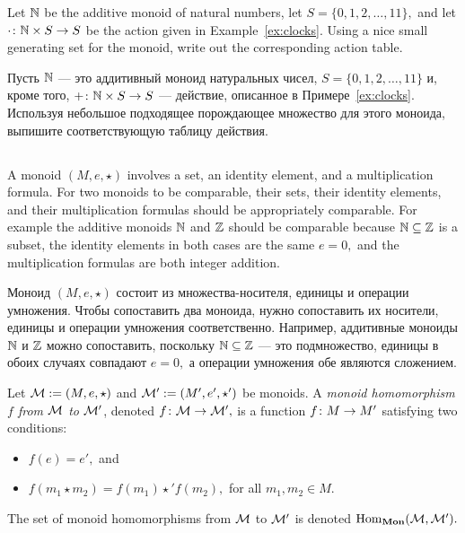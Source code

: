\documentclass[../main/CT4S-EN-RU]{subfiles}
\begin{document}
\begin{exerciseENG}
Let ${\mathbb N}$ be the additive monoid of natural numbers, let $S=\{0,1,2,\ldots,11\},$ and let $\cdot\colon{\mathbb N}\times S\rightarrow S$ be the action given in Example~\ref{ex:clocks}. Using a nice small generating set for the monoid, write out the corresponding action table.
\end{exerciseENG}

\begin{exerciseRUS}
Пусть ${\mathbb N}$ — это аддитивный моноид натуральных чисел, $S=\{0,1,2,\ldots,11\}$ и, кроме того,  $+\colon{\mathbb N}\times S\rightarrow S$ — действие, описанное в Примере~\ref{ex:clocks}. Используя небольшое подходящее порождающее множество для этого моноида, выпишите соответствующую таблицу действия.
\end{exerciseRUS}


\subsection{}

\begin{blockENG}
A monoid $(M,e,\star)$ involves a set, an identity element, and a multiplication formula. For two monoids to be comparable, their sets, their identity elements, and their multiplication formulas should be appropriately comparable. For example the additive monoids ${\mathbb N}$ and ${\mathbb Z}$ should be comparable because ${\mathbb N}\subseteq{\mathbb Z}$ is a subset, the identity elements in both cases are the same $e=0,$ and the multiplication formulas are both integer addition.
\end{blockENG}

\begin{blockRUS}
Моноид $(M,e,\star)$ состоит из множества-носителя, единицы и операции умножения. Чтобы сопоставить два моноида, нужно сопоставить их носители, единицы и операции умножения соответственно. Например, аддитивные моноиды ${\mathbb N}$ и ${\mathbb Z}$ можно сопоставить, поскольку ${\mathbb N}\subseteq{\mathbb Z}$ — это подмножество, единицы в обоих случаях совпадают $e=0,$ а операции умножения обе являются сложением.
\end{blockRUS}

\begin{definitionENG}\label{def:monoid hom}
Let $\mathcal{M}:=(M,e,\star)$ and $\mathcal{M}':=(M',e',\star')$ be monoids. A {\em monoid homomorphism $f$ from $\mathcal{M}$ to $\mathcal{M}'$}, denoted $f\colon\mathcal{M}\rightarrow\mathcal{M}',$ is a function $f\colon M\rightarrow M'$ satisfying two conditions:
\begin{itemize}
\item $f(e)=e',$ and
\item $f(m_1\star m_2)=f(m_1)\star'f(m_2),$ for all $m_1,m_2\in M.$
\end{itemize}
The set of monoid homomorphisms from $\mathcal{M}$ to $\mathcal{M}'$ is denoted $\operatorname{Hom}_{{\mathbf{Mon}}}(\mathcal{M},\mathcal{M}').$
\end{definitionENG}
\end{document}
